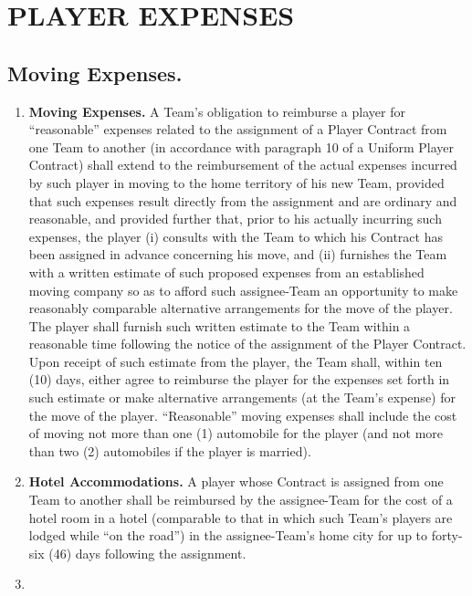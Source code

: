 \documentclass[
]{book}
\providecommand{\tightlist}{%
  \setlength{\itemsep}{0pt}\setlength{\parskip}{0pt}}
\begin{document}
\hypertarget{player-expenses}{%
\chapter{PLAYER EXPENSES}\label{player-expenses}}

\hypertarget{moving-expenses.}{%
\section{Moving Expenses.}\label{moving-expenses.}}

\begin{enumerate}
\def\labelenumi{(\alph{enumi})}
\tightlist
\item
  \textbf{Moving Expenses.} A Team's obligation to reimburse a player for ``reasonable'' expenses related to the assignment of a Player Contract from one Team to another (in accordance with paragraph 10 of a Uniform Player Contract) shall extend to the reimbursement of the actual expenses incurred by such player in moving to the home territory of his new Team, provided that such expenses result directly from the assignment and are ordinary and reasonable, and provided further that, prior to his actually incurring such expenses, the player (i) consults with the Team to which his Contract has been assigned in advance concerning his move, and (ii) furnishes the Team with a written estimate of such proposed expenses from an established moving company so as to afford such assignee-Team an opportunity to make reasonably comparable alternative arrangements for the move of the player. The player shall furnish such written estimate to the Team within a reasonable time following the notice of the assignment of the Player Contract. Upon receipt of such estimate from the player, the Team shall, within ten (10) days, either agree to reimburse the player for the expenses set forth in such estimate or make alternative arrangements (at the Team's expense) for the move of the player. ``Reasonable'' moving expenses shall include the cost of moving not more than one (1) automobile for the player (and not more than two (2) automobiles if the player is married).
\item
  \textbf{Hotel Accommodations.} A player whose Contract is assigned from one Team to another shall be reimbursed by the assignee-Team for the cost of a hotel room in a hotel (comparable to that in which such Team's players are lodged while ``on the road'') in the assignee-Team's home city for up to forty-six (46) days following the assignment.
\item

\end{enumerate}
\end{document}
